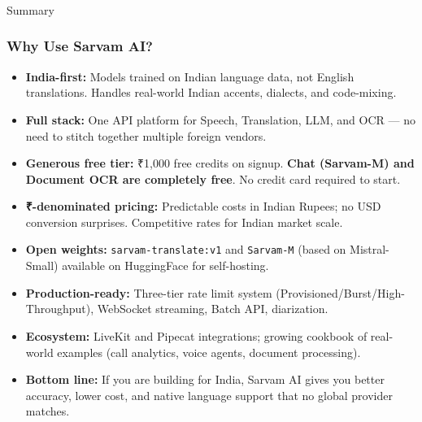 \begin{frame}[fragile]\frametitle{}
\begin{center}
{\Large Summary}
\end{center}
\end{frame}

\begin{frame}[fragile]\frametitle{Why Use Sarvam AI?}
  \begin{itemize}
    \item \textbf{India-first:} Models trained on Indian language data, not English translations. Handles real-world Indian accents, dialects, and code-mixing.
    \item \textbf{Full stack:} One API platform for Speech, Translation, LLM, and OCR --- no need to stitch together multiple foreign vendors.
    \item \textbf{Generous free tier:} ₹1,000 free credits on signup. \textbf{Chat (Sarvam-M) and Document OCR are completely free}. No credit card required to start.
    \item \textbf{₹-denominated pricing:} Predictable costs in Indian Rupees; no USD conversion surprises. Competitive rates for Indian market scale.
    \item \textbf{Open weights:} \texttt{sarvam-translate:v1} and \texttt{Sarvam-M} (based on Mistral-Small) available on HuggingFace for self-hosting.
    \item \textbf{Production-ready:} Three-tier rate limit system (Provisioned/Burst/High-Throughput), WebSocket streaming, Batch API, diarization.
    \item \textbf{Ecosystem:} LiveKit and Pipecat integrations; growing cookbook of real-world examples (call analytics, voice agents, document processing).
    \item \textbf{Bottom line:} If you are building for India, Sarvam AI gives you better accuracy, lower cost, and native language support that no global provider matches.
  \end{itemize}
\end{frame}

